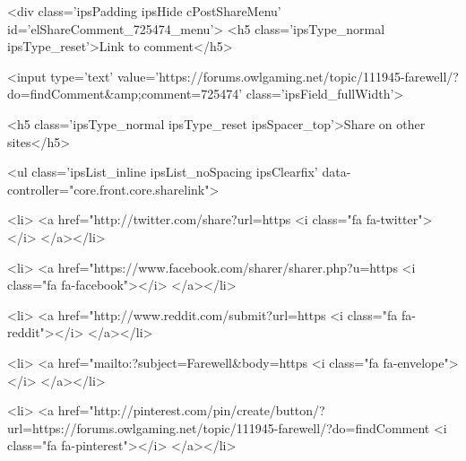 	



<div class='ipsPadding ipsHide cPostShareMenu' id='elShareComment_725474_menu'>
	<h5 class='ipsType_normal ipsType_reset'>Link to comment</h5>
	
		
	
	
	<input type='text' value='https://forums.owlgaming.net/topic/111945-farewell/?do=findComment&amp;comment=725474' class='ipsField_fullWidth'>

	
	<h5 class='ipsType_normal ipsType_reset ipsSpacer_top'>Share on other sites</h5>
	

	<ul class='ipsList_inline ipsList_noSpacing ipsClearfix' data-controller="core.front.core.sharelink">
		
			<li>
<a href="http://twitter.com/share?url=https%
	<i class="fa fa-twitter"></i>
</a></li>
		
			<li>
<a href="https://www.facebook.com/sharer/sharer.php?u=https%
	<i class="fa fa-facebook"></i>
</a></li>
		
			<li>
<a href="http://www.reddit.com/submit?url=https%
	<i class="fa fa-reddit"></i>
</a></li>
		
			<li>
<a href="mailto:?subject=Farewell&body=https%
	<i class="fa fa-envelope"></i>
</a></li>
		
			<li>
<a href="http://pinterest.com/pin/create/button/?url=https://forums.owlgaming.net/topic/111945-farewell/?do=findComment%
	<i class="fa fa-pinterest"></i>
</a></li>
		
